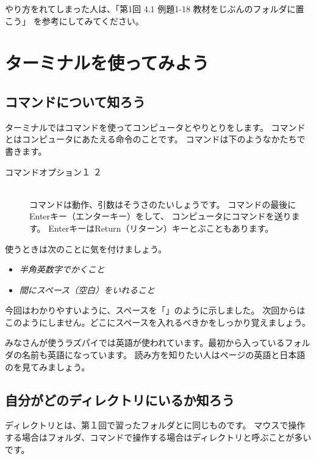 やり方をれてしまった人は、「第1回 4.1 例題1-18 教材をじぶんのフォルダに置こう」 を参考にしてみてください。

\section{ターミナルを使ってみよう}
\subsection{コマンドについて知ろう}

ターミナルではコマンドを使ってコンピュータとやりとりをします。
コマンドとはコンピュータにあたえる命令のことです。
コマンドは下のようなかたちで書きます。

\begin{description}
\item[コマンド\textvisiblespace オプション\textvisiblespace {}１\textvisiblespace 
{}２]\mbox{}\\
 コマンドは動作、引数はそうさのたいしょうです。
 コマンドの最後にEnterキー（エンターキー）をして、
 コンピュータにコマンドを送ります。
 EnterキーはReturn（リターン）キーとぶこともあります。
\end{description}

使うときは次のことに気を付けましょう。
\begin{itemize}
\item \emph{半角英数字でかくこと}
\item \emph{間にスペース（空白）をいれること}
\end{itemize}

今回はわかりやすいように、スペースを「\textvisiblespace 」のように示しました。
次回からはこのようにしません。どこにスペースを入れるべきかをしっかり覚えましょう。

みなさんが使うラズパイでは英語が使われています。最初から入っているフォルダの名前も英語になっています。
読み方を知りたい人は\pageref{英語と日本語の対応表}ページの英語と日本語のを見てみましょう。

\subsection{自分がどのディレクトリにいるか知ろう}
ディレクトリとは、第１回で習ったフォルダとに同じものです。
マウスで操作する場合はフォルダ、コマンドで操作する場合はディレクトリと呼ぶことが多いです。

